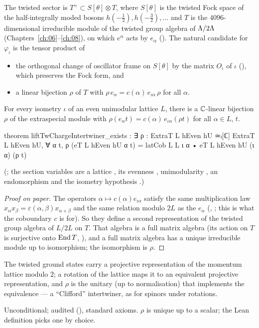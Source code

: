 The twisted sector is $T^+\subset S[\theta]\otimes T$, where $S[\theta]$ is the twisted Fock space of the
half-integrally moded bosons $h(-\tfrac12),h(-\tfrac32),\dots$ and $T$ is the $4096$-dimensional irreducible module of the
twisted group algebra of ${\Lambda}/2{\Lambda}$ (Chapters~\ref{ch:06}--\ref{ch:08}), on which $e^\alpha$ acts by
$e_\alpha$ ().  The natural candidate for $\varphi_\iota$ is the tensor product of
\begin{itemize}
\item the orthogonal change of oscillator frame on $S[\theta]$ by the matrix $O_\iota$ of $\iota$
  (), which preserves the Fock form, and
\item a linear bijection $\rho$ of $T$ with $\rho\,e_\alpha=c(\alpha)\,e_{\iota\alpha}\,\rho$ for all $\alpha$.
\end{itemize}

\begin{theorem}\label{ch22:thm:rho}
For every isometry $\iota$ of an even unimodular lattice $L$, there is a ${\mathbb{C}}$-linear bijection $\rho$
of the extraspecial module with $\rho(e_\alpha t)=c(\alpha)\,e_{\iota\alpha}(\rho t)$ for all $\alpha\in L$, $t$.
\end{theorem}
\begin{leancode}
theorem liftTwChargeIntertwiner_exists :
    ∃ ρ : ExtraT L hEven hU ≃ₗ[ℂ] ExtraT L hEven hU,
      ∀ α t, ρ (eT L hEven hU α t) =
        latCob L L ι α • eT L hEven hU (ι α) (ρ t)
\end{leancode}
(; the section variables are a lattice , its evenness
, unimodularity , an endomorphism  and the isometry hypothesis
.)
\begin{proof}[Proof on paper]
The operators $\alpha\mapsto c(\alpha)e_{\iota\alpha}$ satisfy the same multiplication law
$x_\alpha x_\beta=\varepsilon(\alpha,\beta)x_{\alpha+\beta}$ and the same relation modulo $2L$ as the $e_\alpha$
(, ; this is what the coboundary $c$ is for).  So they define a
second representation of the twisted group algebra of $L/2L$ on $T$.  That algebra is a full matrix algebra (its action
on $T$ is surjective onto $\operatorname{End} T$, ), and a full matrix algebra has a unique
irreducible module up to isomorphism; the isomorphism is $\rho$.
\end{proof}
\begin{physics}
The twisted ground states carry a projective representation of the momentum lattice modulo $2$; a rotation of the
lattice maps it to an equivalent projective representation, and $\rho$ is the unitary (up to normalisation) that
implements the equivalence --- a ``Clifford'' intertwiner, as for spinors under rotations.
\end{physics}
\begin{status}Unconditional; audited (), standard axioms.  $\rho$
is unique up to a scalar; the Lean definition  picks one by choice.\end{status}

